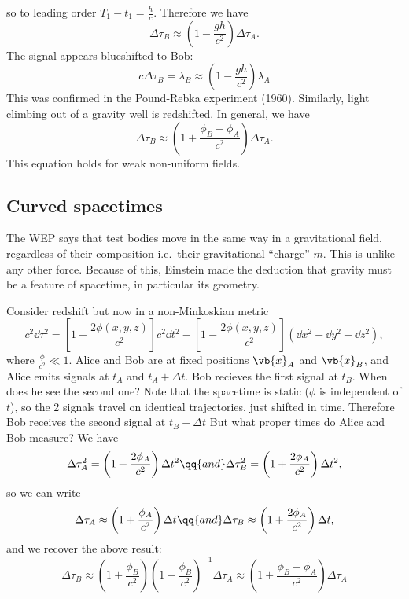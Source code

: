 \documentclass{jknotes}
\begin{document}
so to leading order \(T_1 - t_1 = \frac{h}{c}\). Therefore we have
\begin{equation}
    \Delta\tau_B \approx \left(1-\frac{gh}{c^2}\right)\Delta\tau_A.
\end{equation}
The signal appears blueshifted to Bob:
\begin{equation}
    c\Delta\tau_B = \lambda_B \approx \left(1-\frac{gh}{c^2}\right)\lambda_A
\end{equation}
This was confirmed in the Pound-Rebka experiment (1960). Similarly, light climbing out of a gravity well is redshifted. In general, we have
\begin{equation}
    \Delta\tau_B \approx \left(1+\frac{\phi_B-\phi_A}{c^2}\right)\Delta\tau_A.
\end{equation}
This equation holds for weak non-uniform fields.

\subsection{Curved spacetimes}
The WEP says that test bodies move in the same way in a gravitational field, regardless of their composition i.e.\ their gravitational ``charge'' \(m\). This is unlike any other force. Because of this, Einstein made the deduction that gravity must be a feature of spacetime, in particular its geometry.

Consider redshift but now in a non-Minkoskian metric
\begin{equation}
    c^2\dd{\tau}^2 = \left[1+\frac{2\phi(x,y,z)}{c^2}\right]c^2\dd{t}^2 - \left[1-\frac{2\phi(x,y,z)}{c^2}\right](\dd{x}^2+\dd{y}^2+\dd{z}^2),
\end{equation}
where \(\frac{\phi}{c^2}\ll1\). Alice and Bob are at fixed positions \(\vb{x}_A\) and \(\vb{x}_B\), and Alice emits signals at \(t_A\) and \(t_A+\Delta t\). Bob recieves the first signal at \(t_B\). When does he see the second one? Note that the spacetime is static (\(\phi\) is independent of \(t\)), so the 2 signals travel on identical trajectories, just shifted in time. Therefore Bob receives the second signal at \(t_B+\Delta t\) But what proper times do Alice and Bob measure? We have
\begin{equation}
    \Delta \tau_A^2 = \left(1+\frac{2\phi_A}{c^2}\right)\Delta t^2 \qq{and} \Delta\tau_B^2 = \left(1+\frac{2\phi_A}{c^2}\right)\Delta t^2,
\end{equation}
so we can write
\begin{equation}
    \Delta \tau_A \approx \left(1+\frac{\phi_A}{c^2}\right)\Delta t \qq{and} \Delta\tau_B \approx \left(1+\frac{2\phi_A}{c^2}\right)\Delta t,
\end{equation}
and we recover the above result:
\begin{equation}
    \Delta\tau_B \approx \left(1+\frac{\phi_B}{c^2}\right)\left(1+\frac{\phi_B}{c^2}\right)^{-1} \Delta\tau_A \approx \left(1+\frac{\phi_B-\phi_A}{c^2}\right)\Delta\tau_A
\end{equation}
\end{document}
